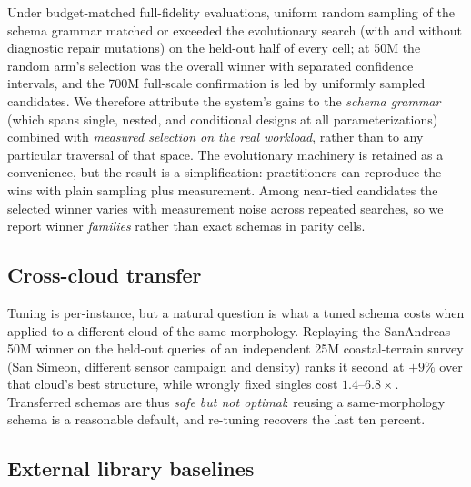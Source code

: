 Under budget-matched full-fidelity evaluations, uniform random sampling of the schema grammar matched or exceeded the evolutionary search (with and without diagnostic repair mutations) on the held-out half of every cell; at 50M the random arm's selection was the overall winner with separated confidence intervals, and the 700M full-scale confirmation is led by uniformly sampled candidates. We therefore attribute the system's gains to the \emph{schema grammar} (which spans single, nested, and conditional designs at all parameterizations) combined with \emph{measured selection on the real workload}, rather than to any particular traversal of that space. The evolutionary machinery is retained as a convenience, but the result is a simplification: practitioners can reproduce the wins with plain sampling plus measurement. Among near-tied candidates the selected winner varies with measurement noise across repeated searches, so we report winner \emph{families} rather than exact schemas in parity cells.

\subsection{Cross-cloud transfer}
\label{sec:eval-transfer}

Tuning is per-instance, but a natural question is what a tuned schema costs when applied to a different cloud of the same morphology. Replaying the SanAndreas-50M winner on the held-out queries of an independent 25M coastal-terrain survey (San Simeon, different sensor campaign and density) ranks it second at $+9\%$ over that cloud's best structure, while wrongly fixed singles cost $1.4$--$6.8\times$. Transferred schemas are thus \emph{safe but not optimal}: reusing a same-morphology schema is a reasonable default, and re-tuning recovers the last ten percent.

\subsection{External library baselines}
\label{sec:eval-frameworks}

